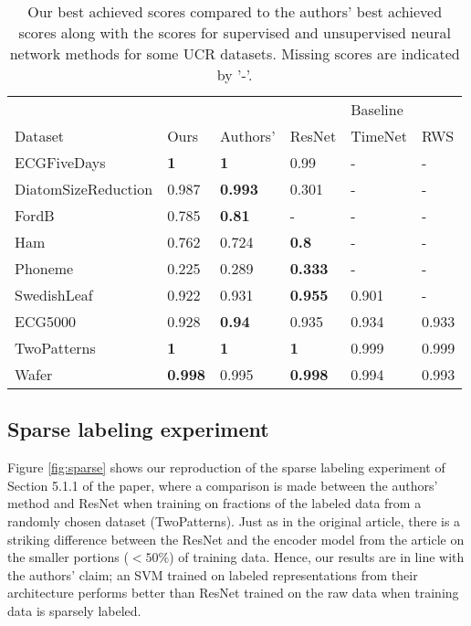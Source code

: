 \begin{table}[h!]
\setlength{\tabcolsep}{7.5pt}
\caption{Our best achieved scores compared to the authors' best achieved scores along with the scores for supervised and unsupervised neural network methods for some UCR datasets. Missing scores are indicated by '-'.}
\label{tab:table1nn}
\centering
\begin{tabular}{llllll}
\hline
                    &                &                &\vrule & Baseline \\

Dataset             & Ours           & Authors'       &\vrule ResNet         & TimeNet & RWS   \\
\hline
ECGFiveDays         & \textbf{1}          & \textbf{1}     & 0.99           & -       & -     \\
DiatomSizeReduction & 0.987 & \textbf{0.993} & 0.301          & -       & -     \\
FordB               & 0.785          & \textbf{0.81}  & -              & -       & -     \\
Ham                 & 0.762          & 0.724          & \textbf{0.8}   & -       & -     \\
Phoneme             & 0.225           & 0.289          & \textbf{0.333} & -       & -     \\
SwedishLeaf         & 0.922          & 0.931          & \textbf{0.955} & 0.901   & -    \\ \hdashline
ECG5000             & 0.928          & \textbf{0.94} & 0.935          & 0.934   & 0.933 \\
TwoPatterns         & \textbf{1}     & \textbf{1}     & \textbf{1}     & 0.999   & 0.999 \\
Wafer               & \textbf{0.998}          & 0.995 & \textbf{0.998} & 0.994   & 0.993  

\end{tabular}
\end{table}
\newpage
\subsection{Sparse labeling experiment}

Figure \ref{fig:sparse} shows our reproduction of the sparse labeling experiment of Section 5.1.1 of the paper, where a comparison is made between the authors' method and ResNet when training on fractions of the labeled data from a randomly chosen dataset (TwoPatterns). Just as in the original article, there is a striking difference between the ResNet and the encoder model from the article on the smaller portions ($<50\%$) of training data. Hence, our results are in line with the authors' claim; an SVM trained on labeled representations from their architecture performs better than ResNet trained on the raw data when training data is sparsely labeled.

